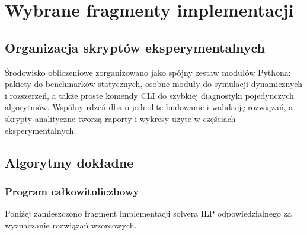 \chapter{Wybrane fragmenty implementacji}

\section{Organizacja skryptów eksperymentalnych}
Środowisko obliczeniowe zorganizowano jako spójny zestaw modułów
Pythona: pakiety do benchmarków statycznych, osobne moduły do
symulacji dynamicznych i rozszerzeń, a także proste komendy CLI do
szybkiej diagnostyki pojedynczych algorytmów. Wspólny rdzeń dba o
jednolite budowanie i walidację rozwiązań, a skrypty analityczne
tworzą raporty i wykresy użyte w częściach eksperymentalnych.

\section{Algorytmy dokładne}
\subsection{Program całkowitoliczbowy}
Poniżej zamieszczono fragment implementacji solvera ILP odpowiedzialnego
za wyznaczanie rozwiązań wzorcowych.

